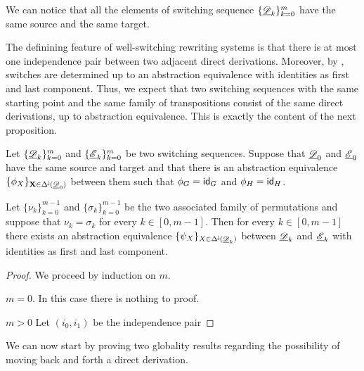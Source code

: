 \begin{remark}\label{rem:st}
	We can notice that all the elements of switching sequence $\{\underline{\mathscr{D}}_{k}\}_{k=0}^m$ have the same source and the same target.
\end{remark}

The definining feature of well-switching rewriting systems is that there is at most one independence pair between two adjacent direct derivations. Moreover, by , switches are determined up to an abstraction equivalence  with identities as first and last component. Thus, we expect that two switching sequences with the same starting point and the same family of transpositions consist of the same direct derivations, up to abstraction equivalence. This is exactly the content of the next proposition.


\begin{proposition}
	Let $\{\underline{\mathscr{D}}_k\}_{k=0}^m$ and $\{\underline{\mathscr{E}}_k\}_{k=0}^m$ be two switching sequences. Suppose that $\underline{\mathscr{D}}_0$ and $\underline{\mathscr{E}}_0$ have the same source and target and that there is an abstraction equivalence $\{\phi_X\}_{\textbf {\textup{X}}\in \Delta^{\hspace{-1pt}\downarrow\hspace{-1pt}}(\underline{\mathscr{D}}_0)}$ between them such that $\phi_{G}=\mathsf{id}_{G}$ and $\phi_{H}=\mathsf{id}_{H}$. 
	
	Let $\{\nu_k\}_{k=0}^{m-1}$  and $\{\sigma_k\}_{k=0}^{m-1}$ be the two associated family of permutations and suppose that $\nu_k=\sigma_k$ for every $k\in [0, m-1]$. Then for every $k\in [0,m-1]$ there exists an abstraction equivalence $\{\psi_{X}\}_{X\in \Delta^{\hspace{-1pt}\downarrow\hspace{-1pt}}(\underline{\mathscr{D}}_k)}$ between $\underline{\mathscr{D}}_k$ and $\underline{\mathscr{E}}_k$ with identities as first and last component.
\end{proposition}
\begin{proof}
	We proceed by  induction on $m$.
	
	\smallskip\noindent $m=0$. In this case there is nothing to proof.
	
	\smallskip \noindent $m>0$  Let $(i_0, i_1)$ be the independence pair 
	
\end{proof}

We can now  start by proving two globality results regarding the possibility of moving back and forth a direct derivation.


